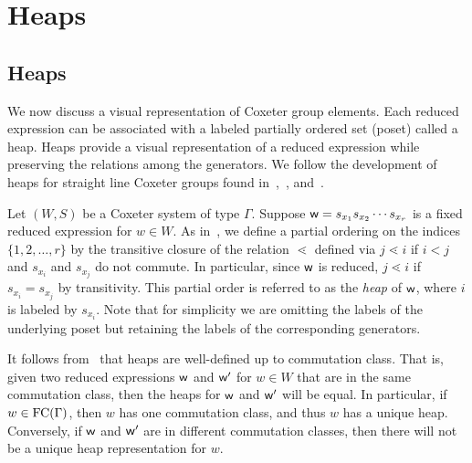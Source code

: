 \chapter{Heaps}

\section{Heaps}\label{sec:Heaps}

We now discuss a visual representation of Coxeter group elements. Each reduced expression can be associated with a labeled partially ordered set (poset) called a heap.  Heaps provide a visual representation of a reduced expression while preserving the relations among the generators. We follow the development of heaps for straight line Coxeter groups found in~\cite{Billey2007},~\cite{Ernst2010}, and~\cite{Stembridge1996}. 

Let $(W,S)$ be a Coxeter system of type $\Gamma$. Suppose $\mathsf{w}=s_{x_1}s_{x_2}\cdots s_{x_r}$ is a fixed reduced expression for $w \in W$. As in~\cite{Stembridge1996}, we define a partial ordering on the indices $\{1, 2, \ldots, r\}$ by the transitive closure of the relation $\lessdot$ defined via $j \lessdot i$ if $i < j$ and $s_{x_i}$ and $s_{x_j}$ do not commute. In particular, since $\mathsf{w}$ is reduced, $j \lessdot i$ if $s_{x_i}=s_{x_j}$ by transitivity. This partial order is referred to as the \emph{heap} of $\mathsf{w}$, where $i$ is labeled by $s_{x_i}$. Note that for simplicity we are omitting the labels of the underlying poset but retaining the labels of the corresponding generators.

It follows from~\cite{Stembridge1996} that heaps are well-defined up to commutation class. That is, given two reduced expressions $\mathsf{w}$ and $\mathsf{w}'$ for $w \in W$ that are in the same commutation class, then the heaps for $\mathsf{w}$ and $\mathsf{w}'$ will be equal. In particular, if $w \in \mathrm{FC}(\Gamma)$, then $w$ has one commutation class, and thus $w$ has a unique heap. Conversely, if $\mathsf{w}$ and $\mathsf{w}'$ are in different commutation classes, then there will not be a unique heap representation for $w$.

